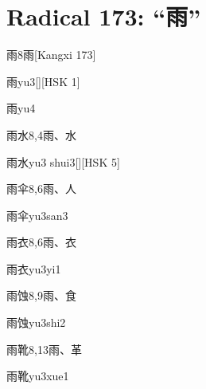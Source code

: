 
\section*{Radical 173: ``⾬''}

\begin{entry}{雨}{8}{⾬}[Kangxi 173]
  \begin{phonetics}{雨}{yu3}[][HSK 1]
  \end{phonetics}
  \begin{phonetics}{雨}{yu4}
  \end{phonetics}
\end{entry}

\begin{entry}{雨水}{8,4}{⾬、⽔}
  \begin{phonetics}{雨水}{yu3 shui3}[][HSK 5]
  \end{phonetics}
\end{entry}

\begin{entry}{雨伞}{8,6}{⾬、⼈}
  \begin{phonetics}{雨伞}{yu3san3}
  \end{phonetics}
\end{entry}

\begin{entry}{雨衣}{8,6}{⾬、⾐}
  \begin{phonetics}{雨衣}{yu3yi1}
  \end{phonetics}
\end{entry}

\begin{entry}{雨蚀}{8,9}{⾬、⾷}
  \begin{phonetics}{雨蚀}{yu3shi2}
  \end{phonetics}
\end{entry}

\begin{entry}{雨靴}{8,13}{⾬、⾰}
  \begin{phonetics}{雨靴}{yu3xue1}
  \end{phonetics}
\end{entry}

